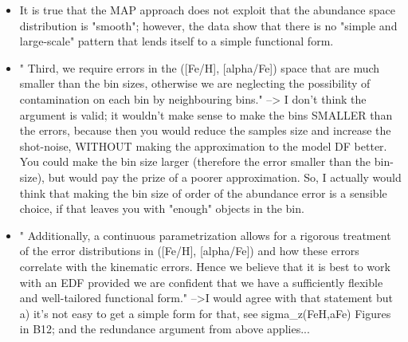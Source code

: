 \begin{itemize}
\begin{itemize}
\item It is true that the MAP approach does not exploit that the abundance space distribution is "smooth"; however, the data show that there is no "simple and large-scale" pattern that lends itself to a simple functional form.
\item " Third, we require errors in the ([Fe/H], [alpha/Fe]) space that are much smaller than the bin sizes, otherwise we are neglecting the possibility of contamination on each bin by neighbouring bins." --> I don't think the argument is valid; it wouldn't make sense to make the bins SMALLER than the errors, because then you would reduce the samples size and increase the shot-noise, WITHOUT making the approximation to the model DF better. You could make the bin size larger (therefore the error smaller than the bin-size), but would pay the prize of a poorer approximation. So, I actually would think that making the bin size of order of the abundance error is a sensible choice, if that leaves you with "enough" objects in the bin.
\item " Additionally, a continuous parametrization allows for a rigorous treatment of the error distributions in ([Fe/H], [alpha/Fe]) and how these errors correlate with the kinematic errors. Hence we believe that it is best to work with an EDF provided we are confident that we have a sufficiently flexible and well-tailored functional form." -->I would agree with that statement but a) it's not easy to get a simple form for that, see sigma\_z(FeH,aFe) Figures in B12; and the redundance argument from above applies...
\end{itemize}


\end{itemize}

